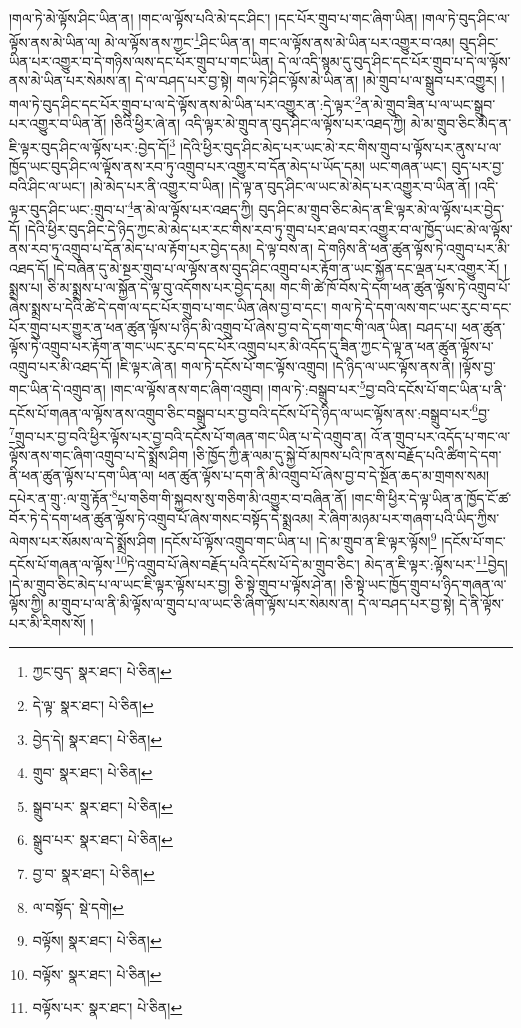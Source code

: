 །གལ་ཏེ་མེ་ལྟོས་ཤིང་ཡིན་ན། །གང་ལ་ལྟོས་པའི་མེ་དང་ཤིང་། །དང་པོར་གྲུབ་པ་གང་ཞིག་ཡིན། །གལ་ཏེ་བུད་ཤིང་ལ་ལྟོས་ནས་མེ་ཡིན་ལ། མེ་ལ་ལྟོས་ནས་ཀྱང་\footnote{ཀྱང་བུད་  སྣར་ཐང་།  པེ་ཅིན། }ཤིང་ཡིན་ན། གང་ལ་ལྟོས་ནས་མེ་ཡིན་པར་འགྱུར་བ་འམ། བུད་ཤིང་ཡིན་པར་འགྱུར་བ་དེ་གཉིས་ལས་དང་པོར་གྲུབ་པ་གང་ཡིན། དེ་ལ་འདི་སྙམ་དུ་བུད་ཤིང་དང་པོར་གྲུབ་པ་དེ་ལ་ལྟོས་ནས་མེ་ཡིན་པར་སེམས་ན། དེ་ལ་བཤད་པར་བྱ་སྟེ། གལ་ཏེ་ཤིང་ལྟོས་མེ་ཡིན་ན། །མེ་གྲུབ་པ་ལ་སྒྲུབ་པར་འགྱུར། །གལ་ཏེ་བུད་ཤིང་དང་པོར་གྲུབ་པ་ལ་དེ་ལྟོས་ནས་མེ་ཡིན་པར་འགྱུར་ན་:དེ་ལྟར་\footnote{དེ་ལྟ་  སྣར་ཐང་།  པེ་ཅིན། }ན་མེ་གྲུབ་ཟིན་པ་ལ་ཡང་སྒྲུབ་པར་འགྱུར་བ་ཡིན་ནོ། །ཅིའི་ཕྱིར་ཞེ་ན། འདི་ལྟར་མེ་གྲུབ་ན་བུད་ཤིང་ལ་ལྟོས་པར་འཐད་ཀྱི། མེ་མ་གྲུབ་ཅིང་མེད་ན་ཇི་ལྟར་བུད་ཤིང་ལ་ལྟོས་པར་:བྱེད་དོ།\footnote{བྱེད་དེ།  སྣར་ཐང་།  པེ་ཅིན། } །དེའི་ཕྱིར་བུད་ཤིང་མེད་པར་ཡང་མེ་རང་གིས་གྲུབ་པ་ལྟོས་པར་ནུས་པ་ལ་ཁྱོད་ཡང་བུད་ཤིང་ལ་ལྟོས་ནས་རབ་ཏུ་འགྲུབ་པར་འགྱུར་བ་དོན་མེད་པ་ཡོད་དམ། ཡང་གཞན་ཡང་། བུད་པར་བྱ་བའི་ཤིང་ལ་ཡང་། །མེ་མེད་པར་ནི་འགྱུར་བ་ཡིན། །དེ་ལྟ་ན་བུད་ཤིང་ལ་ཡང་མེ་མེད་པར་འགྱུར་བ་ཡིན་ནོ། །འདི་ལྟར་བུད་ཤིང་ཡང་:གྲུབ་པ་\footnote{གྲུབ་  སྣར་ཐང་།  པེ་ཅིན། }ན་མེ་ལ་ལྟོས་པར་འཐད་ཀྱི། བུད་ཤིང་མ་གྲུབ་ཅིང་མེད་ན་ཇི་ལྟར་མེ་ལ་ལྟོས་པར་བྱེད་དོ། །དེའི་ཕྱིར་བུད་ཤིང་དེ་ཉིད་ཀྱང་མེ་མེད་པར་རང་གིས་རབ་ཏུ་གྲུབ་པར་ཐལ་བར་འགྱུར་བ་ལ་ཁྱོད་ཡང་མེ་ལ་ལྟོས་ནས་རབ་ཏུ་འགྲུབ་པ་དོན་མེད་པ་ལ་རྟོག་པར་བྱེད་དམ། དེ་ལྟ་བས་ན། དེ་གཉིས་ནི་ཕན་ཚུན་ལྟོས་ཏེ་འགྲུབ་པར་མི་འཐད་དོ། །དེ་བཞིན་དུ་མེ་སྔར་གྲུབ་པ་ལ་ལྟོས་ནས་བུད་ཤིང་འགྲུབ་པར་རྟོག་ན་ཡང་སྐྱོན་དང་ལྡན་པར་འགྱུར་རོ། །སྨྲས་པ། ཅི་མ་སྨྲས་པ་ལ་སྐྱོན་དེ་ལྟ་བུ་འདོགས་པར་བྱེད་དམ། གང་གི་ཚེ་ཁོ་བོས་དེ་དག་ཕན་ཚུན་ལྟོས་ཏེ་འགྲུབ་པོ་ཞེས་སྨྲས་པ་དེའི་ཚེ་དེ་དག་ལ་དང་པོར་གྲུབ་པ་གང་ཡིན་ཞེས་བྱ་བ་དང་། གལ་ཏེ་དེ་དག་ལས་གང་ཡང་རུང་བ་དང་པོར་གྲུབ་པར་གྱུར་ན་ཕན་ཚུན་ལྟོས་པ་ཉིད་མི་འགྲུབ་པོ་ཞེས་བྱ་བ་དེ་དག་གང་གི་ལན་ཡིན། བཤད་པ། ཕན་ཚུན་ལྟོས་ཏེ་འགྲུབ་པར་རྟོག་ན་གང་ཡང་རུང་བ་དང་པོར་འགྲུབ་པར་མི་འདོད་དུ་ཟིན་ཀྱང་དེ་ལྟ་ན་ཕན་ཚུན་ལྟོས་པ་འགྲུབ་པར་མི་འཐད་དོ། །ཇི་ལྟར་ཞེ་ན། གལ་ཏེ་དངོས་པོ་གང་ལྟོས་འགྲུབ། །དེ་ཉིད་ལ་ཡང་ལྟོས་ནས་ནི། །ལྟོས་བྱ་གང་ཡིན་དེ་འགྲུབ་ན། །གང་ལ་ལྟོས་ནས་གང་ཞིག་འགྲུབ། །གལ་ཏེ་:བསྒྲུབ་པར་\footnote{སྒྲུབ་པར་  སྣར་ཐང་།  པེ་ཅིན། }བྱ་བའི་དངོས་པོ་གང་ཡིན་པ་ནི་དངོས་པོ་གཞན་ལ་ལྟོས་ནས་འགྲུབ་ཅིང་བསྒྲུབ་པར་བྱ་བའི་དངོས་པོ་དེ་ཉིད་ལ་ཡང་ལྟོས་ནས་:བསྒྲུབ་པར་\footnote{སྒྲུབ་པར་  སྣར་ཐང་།  པེ་ཅིན། }བྱ་\footnote{བྱ་བ་  སྣར་ཐང་།  པེ་ཅིན། }གྲུབ་པར་བྱ་བའི་ཕྱིར་ལྟོས་པར་བྱ་བའི་དངོས་པོ་གཞན་གང་ཡིན་པ་དེ་འགྲུབ་ན། འོ་ན་གྲུབ་པར་འདོད་པ་གང་ལ་ལྟོས་ནས་གང་ཞིག་འགྲུབ་པ་དེ་སྨྲོས་ཤིག །ཅི་ཁྱོད་ཀྱི་རྣ་ལམ་དུ་སྐྱེ་བོ་མཁས་པའི་ཁ་ནས་བརྗོད་པའི་ཚིག་དེ་དག་ནི་ཕན་ཚུན་ལྟོས་པ་དག་ཡིན་ལ། ཕན་ཚུན་ལྟོས་པ་དག་ནི་མི་འགྲུབ་པོ་ཞེས་བྱ་བ་དེ་སྔོན་ཆད་མ་གྲགས་སམ། དཔེར་ན་གྲུ་:ལ་གྲུ་རྟོན་\footnote{ལ་བསྟོད་  སྡེ་དགེ། }པ་གཅིག་གི་སྐྱབས་སུ་གཅིག་མི་འགྱུར་བ་བཞིན་ནོ། །གང་གི་ཕྱིར་དེ་ལྟ་ཡིན་ན་ཁྱོད་ངོ་ཚ་བོར་ཏེ་དེ་དག་ཕན་ཚུན་ལྟོས་ཏེ་འགྲུབ་པོ་ཞེས་གསང་བསྟོད་དེ་སྨྲའམ། རེ་ཞིག་མཉམ་པར་གཞག་པའི་ཡིད་ཀྱིས་ལེགས་པར་སོམས་ལ་དེ་སྨྲོས་ཤིག །དངོས་པོ་ལྟོས་འགྲུབ་གང་ཡིན་པ། །དེ་མ་གྲུབ་ན་ཇི་ལྟར་ལྟོས།\footnote{བལྟོས།  སྣར་ཐང་།  པེ་ཅིན། } །དངོས་པོ་གང་དངོས་པོ་གཞན་ལ་ལྟོས་\footnote{བལྟོས་  སྣར་ཐང་།  པེ་ཅིན། }ཏེ་འགྲུབ་པོ་ཞེས་བརྗོད་པའི་དངོས་པོ་དེ་མ་གྲུབ་ཅིང་། མེད་ན་ཇི་ལྟར་:ལྟོས་པར་\footnote{བལྟོས་པར་  སྣར་ཐང་།  པེ་ཅིན། }བྱེད། །དེ་མ་གྲུབ་ཅིང་མེད་པ་ལ་ཡང་ཇི་ལྟར་ལྟོས་པར་བྱ། ཅི་སྟེ་གྲུབ་པ་ལྟོས་ཤེ་ན། །ཅི་སྟེ་ཡང་ཁྱོད་གྲུབ་པ་ཉིད་གཞན་ལ་ལྟོས་ཀྱི། མ་གྲུབ་པ་ལ་ནི་མི་ལྟོས་ལ་གྲུབ་པ་ལ་ཡང་ཅི་ཞིག་ལྟོས་པར་སེམས་ན། དེ་ལ་བཤད་པར་བྱ་སྟེ། དེ་ནི་ལྟོས་པར་མི་རིགས་སོ། །
